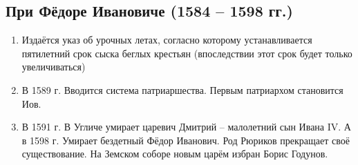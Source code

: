 \subsection{При Фёдоре Ивановиче (1584 – 1598 гг.)}

\begin{enumerate}
    \item{ Издаётся указ об урочных летах, согласно которому устанавливается пятилетний срок сыска беглых крестьян (впоследствии этот срок будет только увеличиваться)}
    \item{ В 1589 г. Вводится система патриаршества. Первым патриархом становится Иов.}
    \item{ В 1591 г. В Угличе умирает царевич Дмитрий – малолетний сын Ивана IV. А в 1598 г. Умирает бездетный Фёдор Иванович. Род Рюриков прекращает своё существование. На Земском соборе новым царём избран Борис Годунов.}
\end{enumerate}
